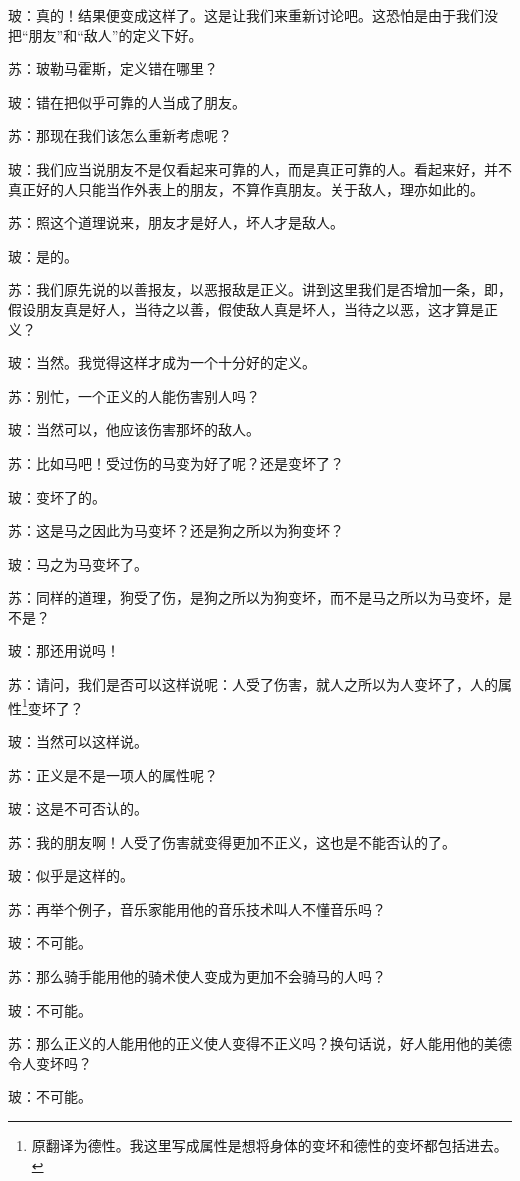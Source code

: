 \documentclass[11pt,oneside]{book}
\begin{document}
\begin{common-format}
玻：真的！结果便变成这样了。这是让我们来重新讨论吧。这恐怕是由于我们没把“朋友”和“敌人”的定义下好。

苏：玻勒马霍斯，定义错在哪里？

玻：错在把似乎可靠的人当成了朋友。

苏：那现在我们该怎么重新考虑呢？

玻：我们应当说朋友不是仅看起来可靠的人，而是真正可靠的人。看起来好，并不真正好的人只能当作外表上的朋友，不算作真朋友。关于敌人，理亦如此的。

苏：照这个道理说来，朋友才是好人，坏人才是敌人。

玻：是的。

苏：我们原先说的以善报友，以恶报敌是正义。讲到这里我们是否增加一条，即，假设朋友真是好人，当待之以善，假使敌人真是坏人，当待之以恶，这才算是正义？

玻：当然。我觉得这样才成为一个十分好的定义。

苏：别忙，一个正义的人能伤害别人吗？

玻：当然可以，他应该伤害那坏的敌人。

苏：比如马吧！受过伤的马变为好了呢？还是变坏了？

玻：变坏了的。

苏：这是马之因此为马变坏？还是狗之所以为狗变坏？

玻：马之为马变坏了。

苏：同样的道理，狗受了伤，是狗之所以为狗变坏，而不是马之所以为马变坏，是不是？

玻：那还用说吗！

苏：请问，我们是否可以这样说呢：人受了伤害，就人之所以为人变坏了，人的属性\footnote{原翻译为德性。我这里写成属性是想将身体的变坏和德性的变坏都包括进去。}变坏了？

玻：当然可以这样说。

苏：正义是不是一项人的属性呢？

玻：这是不可否认的。

苏：我的朋友啊！人受了伤害就变得更加不正义，这也是不能否认的了。

玻：似乎是这样的。

苏：再举个例子，音乐家能用他的音乐技术叫人不懂音乐吗？

玻：不可能。

苏：那么骑手能用他的骑术使人变成为更加不会骑马的人吗？

玻：不可能。

苏：那么正义的人能用他的正义使人变得不正义吗？换句话说，好人能用他的美德令人变坏吗？

玻：不可能。


\end{common-format}
\end{document}

